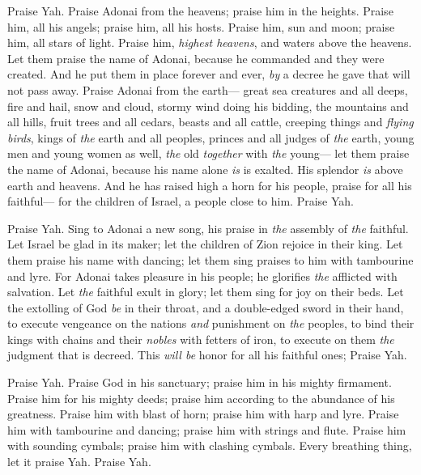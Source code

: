 \begin{biblechapter} %
 Praise Yah. 
Praise Adonai from the heavens; 
praise him in the heights.
\verse Praise him, all his angels; 
praise him, all his hosts.
\verse Praise him, sun and moon; 
praise him, all stars of light.
\verse Praise him, \textit{highest heavens}, 
and waters above the heavens.
\verse Let them praise the name of Adonai, 
because he commanded and they were created.
\verse And he put them in place forever and ever, 
\textit{by} a decree he gave that will not pass away.
\verse Praise Adonai from the earth— 
great sea creatures and all deeps,
\verse fire and hail, snow and cloud, 
stormy wind doing his bidding,
\verse the mountains and all hills, 
fruit trees and all cedars,
\verse beasts and all cattle, 
creeping things and \textit{flying birds},
\verse kings of \textit{the} earth and all peoples, 
princes and all judges of \textit{the} earth,
\verse young men and young women as well, 
\textit{the} old \textit{together} with \textit{the} young—
\verse let them praise the name of Adonai, 
because his name alone \textit{is} is exalted. 
His splendor \textit{is} above earth and heavens.
\verse And he has raised high a horn for his people, 
praise for all his faithful— 
for the children of Israel, 
a people close to him. 
Praise Yah.
\end{biblechapter}

\begin{biblechapter} %
 Praise Yah. 
Sing to Adonai a new song, 
his praise in \textit{the} assembly of \textit{the} faithful.
\verse Let Israel be glad in its maker; 
let the children of Zion rejoice in their king.
\verse Let them praise his name with dancing; 
let them sing praises to him with tambourine and lyre.
\verse For Adonai takes pleasure in his people; 
he glorifies \textit{the} afflicted with salvation.
\verse Let \textit{the} faithful exult in glory; 
let them sing for joy on their beds.
\verse Let the extolling of God \textit{be} in their throat, 
and a double-edged sword in their hand,
\verse to execute vengeance on the nations 
\textit{and} punishment on \textit{the} peoples,
\verse to bind their kings with chains 
and their \textit{nobles} with fetters of iron,
\verse to execute on them \textit{the} judgment that is decreed. 
This \textit{will be} honor for all his faithful ones; 
Praise Yah.
\end{biblechapter}

\begin{biblechapter} %
 Praise Yah. 
Praise God in his sanctuary; 
praise him in his mighty firmament.
\verse Praise him for his mighty deeds; 
praise him according to the abundance of his greatness.
\verse Praise him with blast of horn; 
praise him with harp and lyre.
\verse Praise him with tambourine and dancing; 
praise him with strings and flute.
\verse Praise him with sounding cymbals; 
praise him with clashing cymbals.
\verse Every breathing thing, 
let it praise Yah. 
Praise Yah.
\end{biblechapter}

